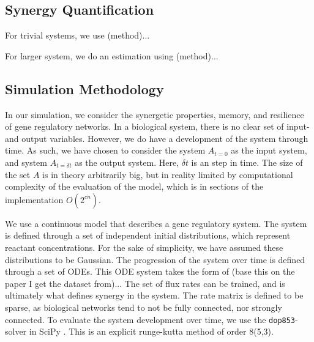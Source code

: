 \documentclass[../main.tex]{subfiles}
\begin{document}
\subsection{Synergy Quantification}

For trivial systems, we use (method)...

For larger system, we do an estimation using (method)...

\subsection{Simulation Methodology}

In our simulation, we consider the synergetic properties, memory, and resilience of gene regulatory networks.
In a biological system, there is no clear set of input- and output variables.
However, we do have a development of the system through time.
As such, we have chosen to consider the system $A_{t=0}$ as the input system, and system $A_{t=\delta t}$ as the output system.
Here, $\delta t$ is an step in time. %
The size of the set $A$ is in theory arbitrarily big, but in reality limited by computational complexity of the evaluation of the model, which is in sections of the implementation $O(2^{c \dot n})$.

We use a continuous model that describes a gene regulatory system.
The system is defined through a set of independent initial distributions, which represent reactant concentrations.
For the sake of simplicity, we have assumed these distributions to be Gaussian.
The progression of the system over time is defined through a set of ODEs.
This ODE system takes the form of (base this on the paper I get the dataset from)...
The set of flux rates can be trained, and is ultimately what defines synergy in the system.
The rate matrix is defined to be sparse, as biological networks tend to not be fully connected, nor strongly connected.
To evaluate the system development over time, we use the \texttt{dop853}-solver in SciPy \cite{scipy}.
This is an explicit runge-kutta method of order 8(5,3).
\end{document}
